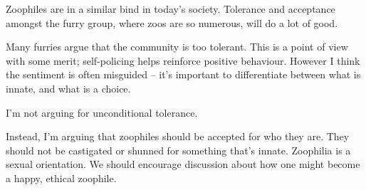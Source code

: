 Zoophiles are in a similar bind in today's society. Tolerance and acceptance amongst the furry group, where zoos are so numerous, will do a lot of good.

Many furries argue that the community is too tolerant. This is a point of view with some merit; self-policing helps reinforce positive behaviour. However I think the sentiment is often misguided -- it's important to differentiate between what is innate, and what is a choice.

I'm not arguing for unconditional tolerance.

Instead, I'm arguing that zoophiles should be accepted for who they are. They should not be castigated or shunned for something that's innate. Zoophilia is a sexual orientation. We should encourage discussion about how one might become a happy, ethical zoophile.
